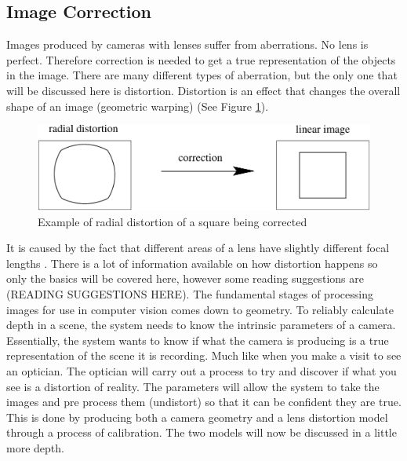 \documentclass[11pt,oneside]{report}
\begin{document}
				\subsection{Image Correction}
				Images produced by cameras with lenses suffer from aberrations.
				No lens is perfect.
				Therefore correction is needed to get a true representation of the objects in the image.
				There are many different types of aberration, but the only one that will be discussed here is distortion.
				Distortion is an effect that changes the overall shape of an image (geometric warping) (See Figure \ref{fig:distortion}).
				\begin{figure}[!h]
				\begin{center}
					
    					\includegraphics[scale=0.5]{distortion_1}
    					\caption{Example of radial distortion of a square being corrected \protect\cite{book:multiViewGeo} {\label{fig:distortion}}}
    				\end{center}
				\end{figure}				
				It is caused by the fact that different areas of a lens have slightly different focal lengths \cite[p. 42]{book:modern}.
				There is a lot of information available on how distortion happens so only the basics will be covered here, however some reading suggestions are (READING SUGGESTIONS HERE).
				The fundamental stages of processing images for use in computer vision comes down to geometry.
				To reliably calculate depth in a scene, the system needs to know the intrinsic %
				parameters of a camera.
				Essentially, the system wants to know if what the camera is producing is a true representation of the scene it is recording.
				Much like when you make a visit to see an optician. 
				The optician will carry out a process to try and discover if what you see is a distortion of reality.
				The parameters will allow the system to take the images and pre process them (undistort) so that it can be confident they are true.
				This is done by producing both a camera geometry and a lens distortion model through a process of calibration.  
				The two models will now be discussed in a little more depth.				
\end{document}
